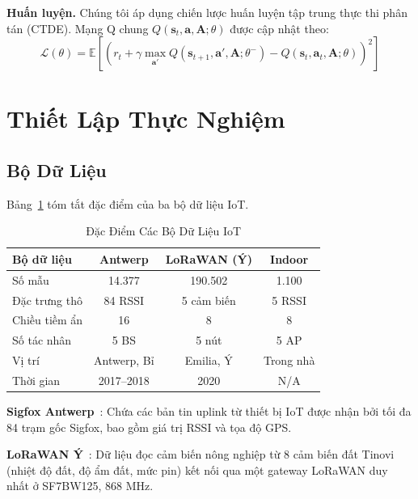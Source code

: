 \documentclass[conference]{IEEEtran}
\begin{document}
\textbf{Huấn luyện.} Chúng tôi áp dụng chiến lược huấn luyện
tập trung thực thi phân tán (CTDE). Mạng Q chung $Q(\mathbf{s}_t,
\mathbf{a}, \mathbf{A}; \theta)$ được cập nhật theo:
\begin{equation}
  \mathcal{L}(\theta) = \mathbb{E}\!\left[
  \!\left(\!r_t + \gamma \max_{\mathbf{a}'} Q(\mathbf{s}_{t+1},
  \mathbf{a}', \mathbf{A}; \theta^-) - Q(\mathbf{s}_t, \mathbf{a}_t,
  \mathbf{A}; \theta)\!\right)^{\!2}\right]
  \label{eq:dqn_loss}
\end{equation}

\section{Thiết Lập Thực Nghiệm}
\label{sec:experiments}

\subsection{Bộ Dữ Liệu}
Bảng~\ref{tab:datasets} tóm tắt đặc điểm của ba bộ dữ liệu IoT.

\begin{table}[h]
\centering
\caption{Đặc Điểm Các Bộ Dữ Liệu IoT}
\label{tab:datasets}
\begin{tabular}{lccc}
\toprule
\textbf{Bộ dữ liệu} & \textbf{Antwerp} & \textbf{LoRaWAN (\'{Y})} & \textbf{Indoor} \\
\midrule
Số mẫu       & 14.377   & 190.502  & 1.100  \\
Đặc trưng thô & 84 RSSI  & 5 cảm biến & 5 RSSI \\
Chiều tiềm ẩn & 16       & 8        & 8      \\
Số tác nhân   & 5 BS     & 5 nút    & 5 AP   \\
Vị trí        & Antwerp, Bỉ & Emilia, Ý & Trong nhà \\
Thời gian     & 2017--2018 & 2020   & N/A    \\
\bottomrule
\end{tabular}
\end{table}

\textbf{Sigfox Antwerp}~\cite{ref_sigfox_antwerp}: Chứa các
bản tin uplink từ thiết bị IoT được nhận bởi tối đa 84 trạm
gốc Sigfox, bao gồm giá trị RSSI và tọa độ GPS.

\textbf{LoRaWAN Ý}~\cite{ref_lorawan_italy}: Dữ liệu đọc cảm
biến nông nghiệp từ 8 cảm biến đất Tinovi (nhiệt độ đất, độ ẩm
đất, mức pin) kết nối qua một gateway LoRaWAN duy nhất ở SF7BW125,
868 MHz.
\end{document}

